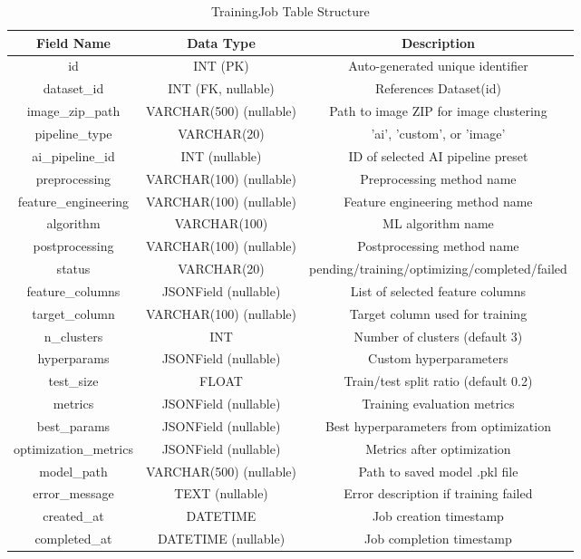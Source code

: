 \documentclass[12pt,a4paper]{report}
\begin{document}
\begin{table}[H]
\centering
\caption{TrainingJob Table Structure}
\begin{tabular}{|c|c|c|}
\hline
\textbf{Field Name} & \textbf{Data Type} & \textbf{Description} \\
\hline
id & INT (PK) & Auto-generated unique identifier \\
dataset\_id & INT (FK, nullable) & References Dataset(id) \\
image\_zip\_path & VARCHAR(500) (nullable) & Path to image ZIP for image clustering \\
pipeline\_type & VARCHAR(20) & 'ai', 'custom', or 'image' \\
ai\_pipeline\_id & INT (nullable) & ID of selected AI pipeline preset \\
preprocessing & VARCHAR(100) (nullable) & Preprocessing method name \\
feature\_engineering & VARCHAR(100) (nullable) & Feature engineering method name \\
algorithm & VARCHAR(100) & ML algorithm name \\
postprocessing & VARCHAR(100) (nullable) & Postprocessing method name \\
status & VARCHAR(20) & pending/training/optimizing/completed/failed \\
feature\_columns & JSONField (nullable) & List of selected feature columns \\
target\_column & VARCHAR(100) (nullable) & Target column used for training \\
n\_clusters & INT & Number of clusters (default 3) \\
hyperparams & JSONField (nullable) & Custom hyperparameters \\
test\_size & FLOAT & Train/test split ratio (default 0.2) \\
metrics & JSONField (nullable) & Training evaluation metrics \\
best\_params & JSONField (nullable) & Best hyperparameters from optimization \\
optimization\_metrics & JSONField (nullable) & Metrics after optimization \\
model\_path & VARCHAR(500) (nullable) & Path to saved model .pkl file \\
error\_message & TEXT (nullable) & Error description if training failed \\
created\_at & DATETIME & Job creation timestamp \\
completed\_at & DATETIME (nullable) & Job completion timestamp \\
\hline
\end{tabular}
\end{table}
\end{document}
